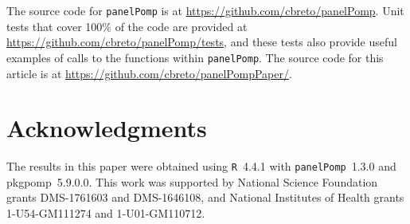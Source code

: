 \documentclass[12pt]{article}\usepackage[]{graphicx}\usepackage[table]{xcolor}
\newcommand\pkg{\texttt}
\newcommand\R{\texttt{R}\xspace}
\newcommand\panelPomp{\texttt{panelPomp}\xspace}
\begin{document}
The source code for \panelPomp is at \url{https://github.com/cbreto/panelPomp}.
Unit tests that cover 100\% of the code are provided at \url{https://github.com/cbreto/panelPomp/tests}, and these tests also provide useful examples of calls to the functions within \panelPomp.
The source code for this article is at \url{https://github.com/cbreto/panelPompPaper/}.

\section*{Acknowledgments}
The results in this paper were obtained using \R~4.4.1 with \pkg{panelPomp}~1.3.0 and pkg{pomp}~5.9.0.0.
This work was supported by National Science Foundation grants DMS-1761603 and DMS-1646108, and National Institutes of Health grants 1-U54-GM111274 and 1-U01-GM110712.




\end{document}
